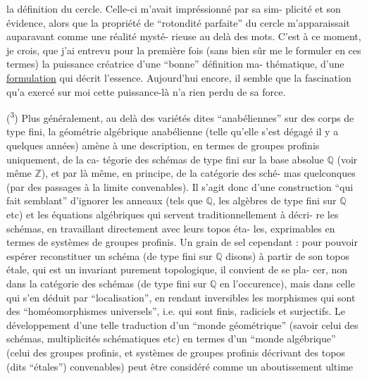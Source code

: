 
la définition du cercle. Celle-ci m'avait impréssionné par sa sim-%
plicité et son évidence, alors que la propriété de ``rotondité
parfaite'' du cercle m'apparaissait auparavant comme une réalité mysté-%
rieuse au delà des mots. C'est à ce moment, je crois, que j'ai
entrevu pour la première fois (sans bien sûr me le formuler en
ces termes) la puissance créatrice d'une ``bonne'' définition ma-%
thématique, d'une \uline{formulation} qui décrit l'essence. Aujourd'hui
encore, il semble que la fascination qu'a exercé sur moi cette
puissance-là n'a rien perdu de sa force.

(\textsuperscript{3}) Plus généralement, au delà des variétés dites ``anabéliennes''
sur des corps de type fini, la géométrie algébrique anabélienne
(telle qu'elle s'est dégagé il y a quelques années) amène à une
description, en termes de groupes profinis uniquement, de la ca-%
tégorie des schémas de type fini sur la base absolue $\mathbb{Q}$ (voir
même $\mathbb{Z}$), et par là même, en principe, de la catégorie des sché-%
mas quelconques (par des passages à la limite convenables). Il
s'agit donc d'une construction ``qui fait semblant'' d'ignorer les
anneaux (tels que $\mathbb{Q}$, les algèbres de type fini sur $\mathbb{Q}$ etc) et
les équations algébriques qui servent traditionnellement à décri-%
re les schémas, en travaillant directement avec leurs topos éta-%
les, exprimables en termes de systèmes de groupes profinis. Un
grain de sel cependant : pour pouvoir espérer reconstituer un
schéma (de type fini sur $\mathbb{Q}$ disons) à partir de son topos étale,
qui est un invariant purement topologique, il convient de se pla-%
cer, non dans la catégorie des schémas (de type fini sur $\mathbb{Q}$ en
l'occurence), mais dans celle qui s'en déduit par ``localisation'',
en rendant inversibles les morphismes qui sont des ``homéomorphismes
universels'', i.e. qui sont finis, radiciels et surjectifs. Le
développement d'une telle traduction d'un ``monde géométrique''
(savoir celui des schémas, multiplicités schématiques etc) en
termes d'un ``monde algébrique'' (celui des groupes profinis, et
systèmes de groupes profinis décrivant des topos (dits ``étales'')
convenables) peut être considéré comme un aboutissement ultime

